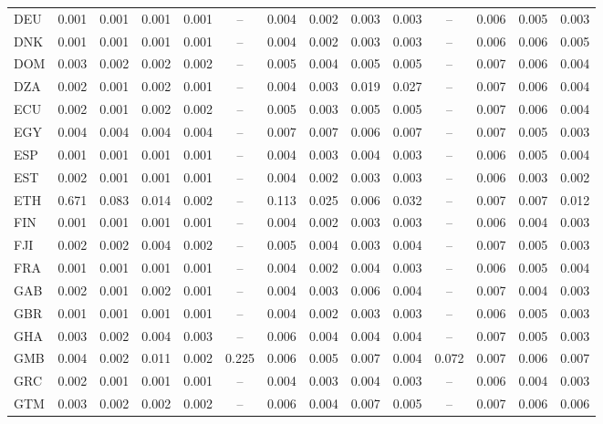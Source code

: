 \begin{longtable}{l*{13}{c}}
DEU & 0.001 & 0.001 & 0.001 & 0.001 & -- & 0.004 & 0.002 & 0.003 & 0.003 & -- & 0.006 & 0.005 & 0.003 \\
DNK & 0.001 & 0.001 & 0.001 & 0.001 & -- & 0.004 & 0.002 & 0.003 & 0.003 & -- & 0.006 & 0.006 & 0.005 \\
DOM & 0.003 & 0.002 & 0.002 & 0.002 & -- & 0.005 & 0.004 & 0.005 & 0.005 & -- & 0.007 & 0.006 & 0.004 \\
DZA & 0.002 & 0.001 & 0.002 & 0.001 & -- & 0.004 & 0.003 & 0.019 & 0.027 & -- & 0.007 & 0.006 & 0.004 \\
ECU & 0.002 & 0.001 & 0.002 & 0.002 & -- & 0.005 & 0.003 & 0.005 & 0.005 & -- & 0.007 & 0.006 & 0.004 \\
EGY & 0.004 & 0.004 & 0.004 & 0.004 & -- & 0.007 & 0.007 & 0.006 & 0.007 & -- & 0.007 & 0.005 & 0.003 \\
ESP & 0.001 & 0.001 & 0.001 & 0.001 & -- & 0.004 & 0.003 & 0.004 & 0.003 & -- & 0.006 & 0.005 & 0.004 \\
EST & 0.002 & 0.001 & 0.001 & 0.001 & -- & 0.004 & 0.002 & 0.003 & 0.003 & -- & 0.006 & 0.003 & 0.002 \\
ETH & 0.671 & 0.083 & 0.014 & 0.002 & -- & 0.113 & 0.025 & 0.006 & 0.032 & -- & 0.007 & 0.007 & 0.012 \\
FIN & 0.001 & 0.001 & 0.001 & 0.001 & -- & 0.004 & 0.002 & 0.003 & 0.003 & -- & 0.006 & 0.004 & 0.003 \\
FJI & 0.002 & 0.002 & 0.004 & 0.002 & -- & 0.005 & 0.004 & 0.003 & 0.004 & -- & 0.007 & 0.005 & 0.003 \\
FRA & 0.001 & 0.001 & 0.001 & 0.001 & -- & 0.004 & 0.002 & 0.004 & 0.003 & -- & 0.006 & 0.005 & 0.004 \\
GAB & 0.002 & 0.001 & 0.002 & 0.001 & -- & 0.004 & 0.003 & 0.006 & 0.004 & -- & 0.007 & 0.004 & 0.003 \\
GBR & 0.001 & 0.001 & 0.001 & 0.001 & -- & 0.004 & 0.002 & 0.003 & 0.003 & -- & 0.006 & 0.005 & 0.003 \\
GHA & 0.003 & 0.002 & 0.004 & 0.003 & -- & 0.006 & 0.004 & 0.004 & 0.004 & -- & 0.007 & 0.005 & 0.003 \\
GMB & 0.004 & 0.002 & 0.011 & 0.002 & 0.225 & 0.006 & 0.005 & 0.007 & 0.004 & 0.072 & 0.007 & 0.006 & 0.007 \\
GRC & 0.002 & 0.001 & 0.001 & 0.001 & -- & 0.004 & 0.003 & 0.004 & 0.003 & -- & 0.006 & 0.004 & 0.003 \\
GTM & 0.003 & 0.002 & 0.002 & 0.002 & -- & 0.006 & 0.004 & 0.007 & 0.005 & -- & 0.007 & 0.006 & 0.006 \\

\end{longtable}
